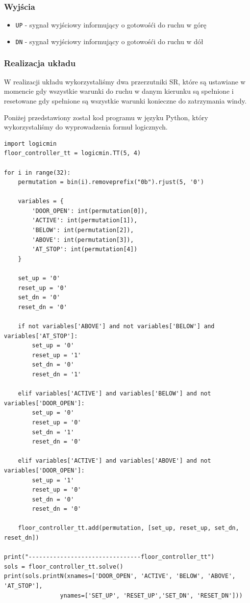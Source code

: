 \documentclass[a4paper]{article}
\begin{document}
\subsubsection{Wyjścia}
\begin{itemize}
    \item \verb|UP| - sygnał wyjściowy informujący o gotowośći do ruchu w górę
    \item \verb|DN| - sygnał wyjściowy informujący o gotowośći do ruchu w dół
\end{itemize}

\subsubsection{Realizacja układu}
W realizacji układu wykorzystaliśmy dwa przerzutniki SR, które są ustawiane w momencie gdy wszystkie
warunki do ruchu w danym kierunku są spełnione i resetowane gdy spełnione są wszystkie warunki konieczne
do zatrzymania windy.

Poniżej przedstawiony został kod programu w języku Python, który wykorzystaliśmy do wyprowadzenia
formuł logicznych.
\begin{verbatim}
import logicmin
floor_controller_tt = logicmin.TT(5, 4)

for i in range(32):
    permutation = bin(i).removeprefix("0b").rjust(5, '0')
    
    variables = {
        'DOOR_OPEN': int(permutation[0]),
        'ACTIVE': int(permutation[1]),
        'BELOW': int(permutation[2]),
        'ABOVE': int(permutation[3]),
        'AT_STOP': int(permutation[4])
    }

    set_up = '0'
    reset_up = '0'
    set_dn = '0'
    reset_dn = '0'

    if not variables['ABOVE'] and not variables['BELOW'] and variables['AT_STOP']:
        set_up = '0'
        reset_up = '1'
        set_dn = '0'
        reset_dn = '1'

    elif variables['ACTIVE'] and variables['BELOW'] and not variables['DOOR_OPEN']:
        set_up = '0'
        reset_up = '0'
        set_dn = '1'
        reset_dn = '0'

    elif variables['ACTIVE'] and variables['ABOVE'] and not variables['DOOR_OPEN']:
        set_up = '1'
        reset_up = '0'
        set_dn = '0'
        reset_dn = '0'

    floor_controller_tt.add(permutation, [set_up, reset_up, set_dn, reset_dn])

print("--------------------------------floor_controller_tt")
sols = floor_controller_tt.solve()
print(sols.printN(xnames=['DOOR_OPEN', 'ACTIVE', 'BELOW', 'ABOVE', 'AT_STOP'],
                ynames=['SET_UP', 'RESET_UP','SET_DN', 'RESET_DN']))
\end{verbatim}
\end{document}
